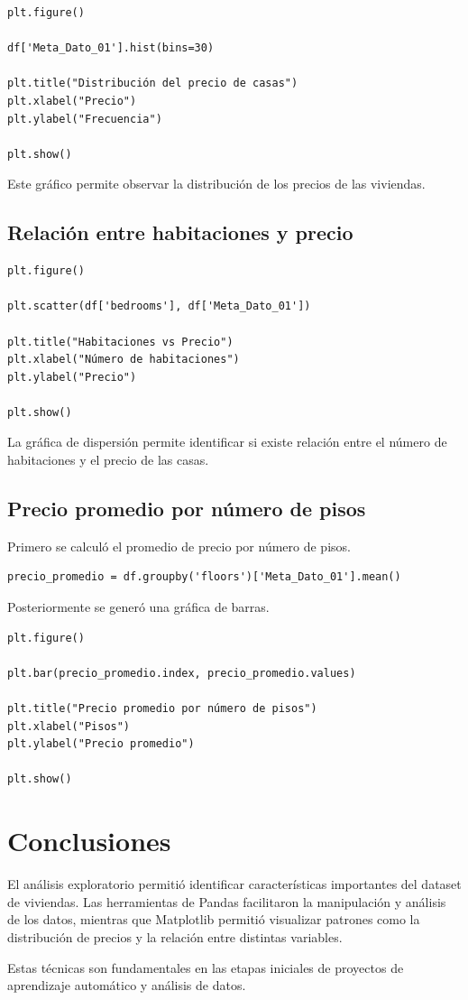 \documentclass{article}
\begin{document}
\begin{lstlisting}
plt.figure()

df['Meta_Dato_01'].hist(bins=30)

plt.title("Distribución del precio de casas")
plt.xlabel("Precio")
plt.ylabel("Frecuencia")

plt.show()
\end{lstlisting}

Este gráfico permite observar la distribución de los precios de las viviendas.

\subsection{Relación entre habitaciones y precio}

\begin{lstlisting}
plt.figure()

plt.scatter(df['bedrooms'], df['Meta_Dato_01'])

plt.title("Habitaciones vs Precio")
plt.xlabel("Número de habitaciones")
plt.ylabel("Precio")

plt.show()
\end{lstlisting}

La gráfica de dispersión permite identificar si existe relación entre
el número de habitaciones y el precio de las casas.

\subsection{Precio promedio por número de pisos}

Primero se calculó el promedio de precio por número de pisos.

\begin{lstlisting}
precio_promedio = df.groupby('floors')['Meta_Dato_01'].mean()
\end{lstlisting}

Posteriormente se generó una gráfica de barras.

\begin{lstlisting}
plt.figure()

plt.bar(precio_promedio.index, precio_promedio.values)

plt.title("Precio promedio por número de pisos")
plt.xlabel("Pisos")
plt.ylabel("Precio promedio")

plt.show()
\end{lstlisting}

\section{Conclusiones}

El análisis exploratorio permitió identificar características importantes
del dataset de viviendas. Las herramientas de Pandas facilitaron la manipulación
y análisis de los datos, mientras que Matplotlib permitió visualizar patrones
como la distribución de precios y la relación entre distintas variables.

Estas técnicas son fundamentales en las etapas iniciales de proyectos de
aprendizaje automático y análisis de datos.
\end{document}
